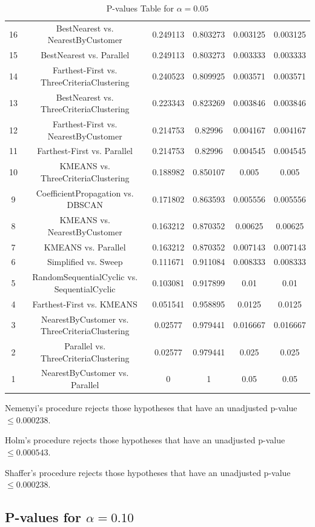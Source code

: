 \documentclass[a4paper,10pt]{article}
\begin{document}
\begin{landscape}
\begin{table}[!htp]
\begin{tabular}{cccccc}
16&BestNearest vs. NearestByCustomer&0.249113&0.803273&0.003125&0.003125\\
15&BestNearest vs. Parallel&0.249113&0.803273&0.003333&0.003333\\
14&Farthest-First vs. ThreeCriteriaClustering&0.240523&0.809925&0.003571&0.003571\\
13&BestNearest vs. ThreeCriteriaClustering&0.223343&0.823269&0.003846&0.003846\\
12&Farthest-First vs. NearestByCustomer&0.214753&0.82996&0.004167&0.004167\\
11&Farthest-First vs. Parallel&0.214753&0.82996&0.004545&0.004545\\
10&KMEANS vs. ThreeCriteriaClustering&0.188982&0.850107&0.005&0.005\\
9&CoefficientPropagation vs. DBSCAN&0.171802&0.863593&0.005556&0.005556\\
8&KMEANS vs. NearestByCustomer&0.163212&0.870352&0.00625&0.00625\\
7&KMEANS vs. Parallel&0.163212&0.870352&0.007143&0.007143\\
6&Simplified vs. Sweep&0.111671&0.911084&0.008333&0.008333\\
5&RandomSequentialCyclic vs. SequentialCyclic&0.103081&0.917899&0.01&0.01\\
4&Farthest-First vs. KMEANS&0.051541&0.958895&0.0125&0.0125\\
3&NearestByCustomer vs. ThreeCriteriaClustering&0.02577&0.979441&0.016667&0.016667\\
2&Parallel vs. ThreeCriteriaClustering&0.02577&0.979441&0.025&0.025\\
1&NearestByCustomer vs. Parallel&0&1&0.05&0.05\\
\hline
\end{tabular}
\caption{P-values Table for $\alpha=0.05$}
\end{table}Nemenyi's procedure rejects those hypotheses that have an unadjusted p-value $\le0.000238$.

Holm's procedure rejects those hypotheses that have an unadjusted p-value $\le0.000543$.

Shaffer's procedure rejects those hypotheses that have an unadjusted p-value $\le0.000238$.

\pagebreak

\subsection{P-values for $\alpha=0.10$}


\end{landscape}
\end{document}
